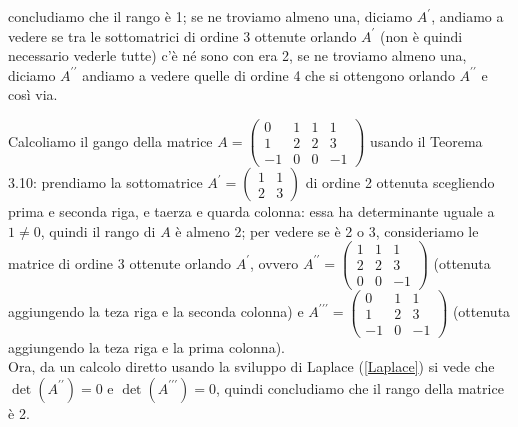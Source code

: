 concludiamo che il rango è 1; se ne troviamo almeno una, diciamo $A^\prime$, andiamo a vedere se
tra le sottomatrici di ordine 3 ottenute orlando $A^\prime$ (non è quindi necessario vederle
tutte) c'è né sono con era 2, se ne troviamo almeno una, diciamo $A^{\prime\prime}$ andiamo
a vedere quelle di ordine 4 che si ottengono orlando $A^{\prime\prime}$ e così via.
\begin{esempio}
  Calcoliamo il gango della matrice $A=
  \begin{pmatrix}
    0 &1 &1&1\\
    1 &2&2 &3\\
    -1 & 0 & 0& -1
  \end{pmatrix}
  $ usando il Teorema 3.10: prendiamo la sottomatrice $A^\prime=
  \begin{pmatrix}
    1 & 1\\
    2 & 3 
  \end{pmatrix}
  $ di ordine 2 ottenuta scegliendo prima e seconda riga, e taerza e quarda colonna: essa ha
  determinante uguale a $1 \neq 0$, quindi il rango di $A$ è almeno 2; per vedere se è 2 o 3,
  consideriamo le matrice di ordine 3 ottenute orlando $A^\prime$, ovvero $A^{\prime\prime}=
  \begin{pmatrix}
    1 &1 &1 \\
    2 & 2 &3 \\
    0 &0 &-1
  \end{pmatrix}
  $ (ottenuta aggiungendo la teza riga e la seconda colonna) e $A^{\prime\prime\prime}=
  \begin{pmatrix}
    0&1 &1 \\
    1 & 2 & 3 \\
    -1 & 0 & -1
  \end{pmatrix}
  $ (ottenuta aggiungendo la teza riga e la prima colonna).\\
  Ora, da un calcolo diretto usando la sviluppo di Laplace (\ref{Laplace}) si vede che $\det (A^{\prime\prime})=0$
  e $\det(A^{\prime\prime\prime})=0$, quindi concludiamo che il rango della matrice è 2.
\end{esempio}
   